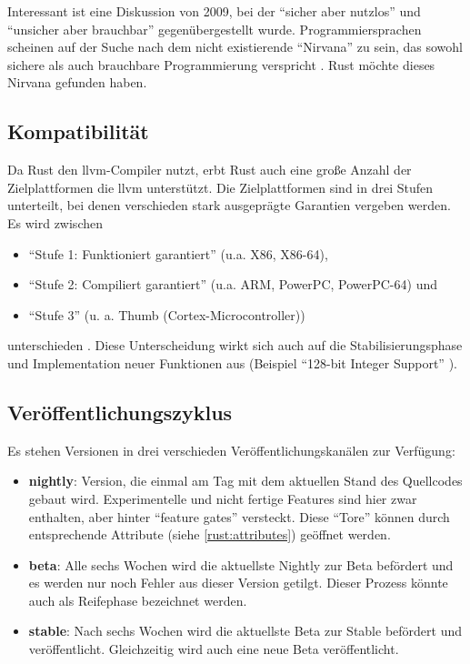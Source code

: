 Interessant ist eine Diskussion von 2009, bei der \enquote{sicher aber nutzlos} und \enquote{unsicher aber brauchbar} gegenübergestellt wurde.
Programmiersprachen scheinen auf der Suche nach dem nicht existierende \enquote{Nirvana} zu sein, das sowohl sichere als auch brauchbare Programmierung verspricht \cite[ab ca Minute 58:20]{rust:infoq:null}.
Rust möchte dieses Nirvana gefunden haben.

\subsection{Kompatibilität}
Da Rust den \gls{llvm}-Compiler nutzt, erbt Rust auch eine große Anzahl der Zielplattformen die \gls{llvm} unterstützt.
Die Zielplattformen sind in drei Stufen unterteilt, bei denen verschieden stark ausgeprägte Garantien vergeben werden. Es wird zwischen
\begin{itemize}
	\item \enquote{Stufe 1: Funktioniert garantiert} (u.a. X86, X86-64),
	\item \enquote{Stufe 2: Compiliert garantiert} (u.a. ARM, PowerPC, PowerPC-64) und
	\item \enquote{Stufe 3} (u. a. Thumb (Cortex-Microcontroller))
\end{itemize}
unterschieden \cite{rust:platform_support}.
Diese Unterscheidung wirkt sich auch auf die Stabilisierungsphase und Implementation neuer Funktionen aus (Beispiel \enquote{128-bit Integer Support} \cite{rust:github:128bit_integer}).

\subsection{Veröffentlichungszyklus}
\label{rust:release_cycles}
\label{rust:feature_gates}

Es stehen Versionen in drei verschieden Veröffentlichungskanälen zur Verfügung:
\begin{itemize}
	\item \textbf{nightly}:
	Version, die einmal am Tag mit dem aktuellen Stand des Quellcodes gebaut wird.
	Experimentelle und nicht fertige Features sind hier zwar enthalten, aber hinter \enquote{feature gates} versteckt.
	Diese \enquote{Tore} können durch entsprechende Attribute (siehe \autoref{rust:attributes}) geöffnet werden.%
	
	\item \textbf{beta}: Alle sechs Wochen wird die aktuellste Nightly zur Beta befördert und es werden nur noch Fehler aus dieser Version getilgt.
	Dieser Prozess könnte auch als Reifephase bezeichnet werden.
	\item \textbf{stable}: Nach sechs Wochen wird die aktuellste Beta zur Stable befördert und veröffentlicht.
	Gleichzeitig wird auch eine neue Beta veröffentlicht.
\end{itemize}

